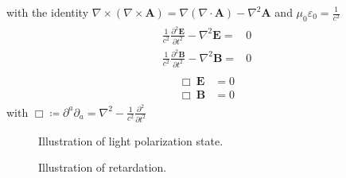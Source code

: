 % 
with the identity $\nabla \times \left( \nabla \times \mathbf{A} \right) = \nabla(\nabla \cdot \mathbf{A}) - \nabla^{2}\mathbf{A}$ and $\mu_0\varepsilon_0 = \frac{1}{c^2}$
% 
\begin{align}
\begin{split} \label{eq::maxwell_wave_equations}
  \frac{1}{c^2} \frac{\partial^2 \mathbf{E}}{\partial t^2} - \nabla^2 \mathbf{E} =& 0 \\
  \frac{1}{c^2} \frac{\partial^2 \mathbf{B}}{\partial t^2} - \nabla^2 \mathbf{B} =& 0
\end{split}
\end{align}
% 
\begin{align}
\begin{split} \label{eq::maxwell_wave_equations_box}
  \Box \ \mathbf{E} &= 0 \\
  \Box \ \mathbf{B} &= 0
\end{split}
\end{align}
% 
with $\Box \coloneqq \partial^a\partial_a = \nabla^2 - \frac{1}{c^2} \frac{\partial^2}{\partial t^2}$
%
\begin{figure}[!tb]
\centering
{}
\label{fig:polarization_state}
\caption{Illustration of light polarization state.}
\end{figure}
%
\begin{figure}[!tb]
\centering
{}
\label{fig:optic_retardation}
\caption{Illustration of retardation.}
\end{figure}
% 
